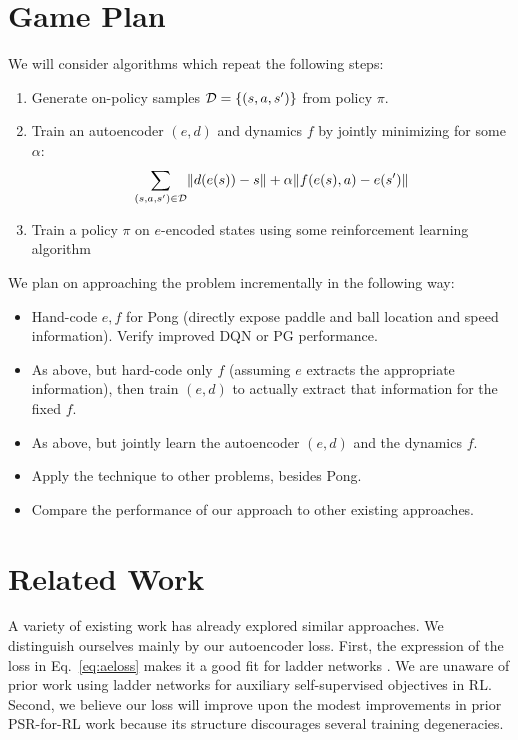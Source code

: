 \documentclass{report}
\begin{document}
\section*{Game Plan}
We will consider algorithms which repeat the following steps:
\begin{enumerate}
  \item
    Generate on-policy samples $\mathcal{D}=\left\{{(s, a, s')}\right\}$ from policy $\pi$.
  \item
    Train an autoencoder $(e, d)$ and dynamics $f$ by jointly minimizing for some $\alpha$:
    \begin{align} \label{eq:aeloss}
      \sum_{(s, a, s')\in\mathcal{D}} \lVert d(e(s)) - s\rVert + \alpha \lVert f(e(s), a) -
    e(s')\rVert
    \end{align}
  \item
    Train a policy $\pi$ on $e$-encoded states using some reinforcement
    learning algorithm
\end{enumerate}
We plan on approaching the problem incrementally in the following way:
\begin{itemize}
  \item
    Hand-code $e,f$ for Pong (directly expose paddle and ball location and speed information). Verify improved DQN or PG performance.
  \item
    As above, but hard-code only $f$ (assuming $e$ extracts the appropriate information), then train $(e,d)$ to actually extract that information for the fixed $f$.
  \item
    As above, but jointly learn the autoencoder $(e, d)$ and the dynamics $f$.
  \item
    Apply the technique to other problems, besides Pong.
  \item
    Compare the performance of our approach to other existing approaches.
\end{itemize}

\section*{Related Work}

A variety of existing work has already explored similar approaches. We distinguish ourselves mainly by our autoencoder loss. First, the expression of the loss in Eq.~\ref{eq:aeloss} makes it a good fit for ladder networks \cite{rasmus2015semi}. We are unaware of prior work using ladder networks for auxiliary self-supervised objectives in RL. Second, we believe our loss will improve upon the modest improvements in prior PSR-for-RL work because its structure discourages several training degeneracies.
\end{document}
